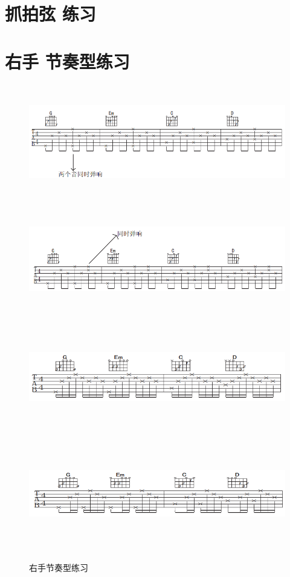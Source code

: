 \documentclass[UTF8,a4paper,12pt]{ctexbook}
\begin{document}
	
	\section{抓拍弦 练习}
	
	
	
	\section{右手 节奏型练习}
		\begin{figure}[H]
			\centering
			\includegraphics[width=17cm,height=5cm]{youshoujiezou}
			\includegraphics[width=17cm,height=5cm]{youshoujiezou1}
			\includegraphics[width=17cm,height=5cm]{youshoujiezou2}
			\includegraphics[width=17cm,height=5cm]{youshoujiezou3}
			\caption{右手节奏型练习}
		\end{figure}
	
\end{document}
